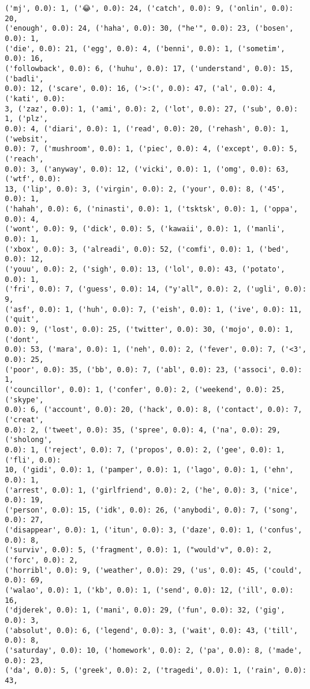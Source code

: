 \documentclass[11pt]{article}
\begin{document}
\begin{Verbatim}[commandchars=\\\{\}]
('mj', 0.0): 1, ('😂', 0.0): 24, ('catch', 0.0): 9, ('onlin', 0.0): 20,
('enough', 0.0): 24, ('haha', 0.0): 30, ("he'", 0.0): 23, ('bosen', 0.0): 1,
('die', 0.0): 21, ('egg', 0.0): 4, ('benni', 0.0): 1, ('sometim', 0.0): 16,
('followback', 0.0): 6, ('huhu', 0.0): 17, ('understand', 0.0): 15, ('badli',
0.0): 12, ('scare', 0.0): 16, ('>:(', 0.0): 47, ('al', 0.0): 4, ('kati', 0.0):
3, ('zaz', 0.0): 1, ('ami', 0.0): 2, ('lot', 0.0): 27, ('sub', 0.0): 1, ('plz',
0.0): 4, ('diari', 0.0): 1, ('read', 0.0): 20, ('rehash', 0.0): 1, ('websit',
0.0): 7, ('mushroom', 0.0): 1, ('piec', 0.0): 4, ('except', 0.0): 5, ('reach',
0.0): 3, ('anyway', 0.0): 12, ('vicki', 0.0): 1, ('omg', 0.0): 63, ('wtf', 0.0):
13, ('lip', 0.0): 3, ('virgin', 0.0): 2, ('your', 0.0): 8, ('45', 0.0): 1,
('hahah', 0.0): 6, ('ninasti', 0.0): 1, ('tsktsk', 0.0): 1, ('oppa', 0.0): 4,
('wont', 0.0): 9, ('dick', 0.0): 5, ('kawaii', 0.0): 1, ('manli', 0.0): 1,
('xbox', 0.0): 3, ('alreadi', 0.0): 52, ('comfi', 0.0): 1, ('bed', 0.0): 12,
('youu', 0.0): 2, ('sigh', 0.0): 13, ('lol', 0.0): 43, ('potato', 0.0): 1,
('fri', 0.0): 7, ('guess', 0.0): 14, ("y'all", 0.0): 2, ('ugli', 0.0): 9,
('asf', 0.0): 1, ('huh', 0.0): 7, ('eish', 0.0): 1, ('ive', 0.0): 11, ('quit',
0.0): 9, ('lost', 0.0): 25, ('twitter', 0.0): 30, ('mojo', 0.0): 1, ('dont',
0.0): 53, ('mara', 0.0): 1, ('neh', 0.0): 2, ('fever', 0.0): 7, ('<3', 0.0): 25,
('poor', 0.0): 35, ('bb', 0.0): 7, ('abl', 0.0): 23, ('associ', 0.0): 1,
('councillor', 0.0): 1, ('confer', 0.0): 2, ('weekend', 0.0): 25, ('skype',
0.0): 6, ('account', 0.0): 20, ('hack', 0.0): 8, ('contact', 0.0): 7, ('creat',
0.0): 2, ('tweet', 0.0): 35, ('spree', 0.0): 4, ('na', 0.0): 29, ('sholong',
0.0): 1, ('reject', 0.0): 7, ('propos', 0.0): 2, ('gee', 0.0): 1, ('fli', 0.0):
10, ('gidi', 0.0): 1, ('pamper', 0.0): 1, ('lago', 0.0): 1, ('ehn', 0.0): 1,
('arrest', 0.0): 1, ('girlfriend', 0.0): 2, ('he', 0.0): 3, ('nice', 0.0): 19,
('person', 0.0): 15, ('idk', 0.0): 26, ('anybodi', 0.0): 7, ('song', 0.0): 27,
('disappear', 0.0): 1, ('itun', 0.0): 3, ('daze', 0.0): 1, ('confus', 0.0): 8,
('surviv', 0.0): 5, ('fragment', 0.0): 1, ("would'v", 0.0): 2, ('forc', 0.0): 2,
('horribl', 0.0): 9, ('weather', 0.0): 29, ('us', 0.0): 45, ('could', 0.0): 69,
('walao', 0.0): 1, ('kb', 0.0): 1, ('send', 0.0): 12, ('ill', 0.0): 16,
('djderek', 0.0): 1, ('mani', 0.0): 29, ('fun', 0.0): 32, ('gig', 0.0): 3,
('absolut', 0.0): 6, ('legend', 0.0): 3, ('wait', 0.0): 43, ('till', 0.0): 8,
('saturday', 0.0): 10, ('homework', 0.0): 2, ('pa', 0.0): 8, ('made', 0.0): 23,
('da', 0.0): 5, ('greek', 0.0): 2, ('tragedi', 0.0): 1, ('rain', 0.0): 43,

\end{Verbatim}
\end{document}
